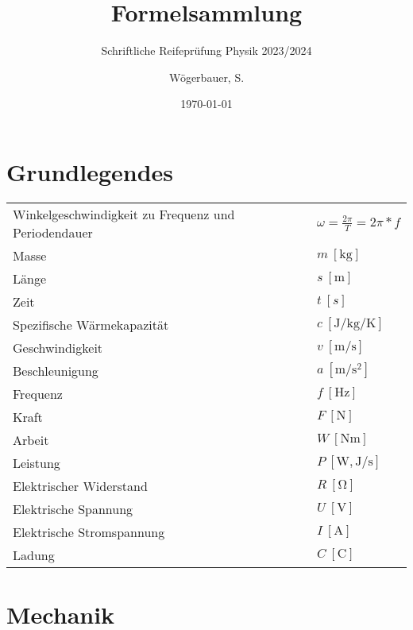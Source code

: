 \documentclass[12pt,a4paper]{paper}
\title{Formelsammlung}
\subtitle{Schriftliche Reifeprüfung Physik 2023/2024}
\author{Wögerbauer, S.}
\date{\today}
\makeatletter
\newcommand{\mathleft}{\@fleqntrue\@mathmargin0pt}
\makeatother
\begin{document}
\maketitle
\smalltableofcontents
\mathleft
\section{Grundlegendes}
\begin{tabularx}{\textwidth}{X|X}
	Winkelgeschwindigkeit zu Frequenz und Periodendauer & $\omega = \frac{2\pi}{T}=2\pi*f$ \\
	Masse & $m\: [\unit{\kilo\gram}]$ \\
	Länge & $s\: [\unit{\meter}]$\\
Zeit & $t\:[s]$\\
Spezifische Wärmekapazität & $c\: [\unit{\joule\per\kilo\gram\per\kelvin}]$\\
Geschwindigkeit & $v\:[\unit{\meter\per\second}]$\\
Beschleunigung & $a\:[\unit{\meter\per\second\squared}]$\\
Frequenz & $f\: [\unit{\hertz}]$\\
Kraft & $F\: [\unit{\newton}]$\\
Arbeit & $W \: [\unit{\newton\meter}]$\\
Leistung & $P \: [\unit{\watt},\unit{\joule\per\second}]$\\
Elektrischer Widerstand & $R\:[\unit{\ohm}]$\\
Elektrische Spannung & $U\:[\unit{\volt}]$\\
Elektrische Stromspannung & $I\:[\unit{\ampere}]$\\
Ladung & $C\:[\unit{\coulomb}]$
\end{tabularx}

\section{Mechanik}
\mathleft
\end{document}
